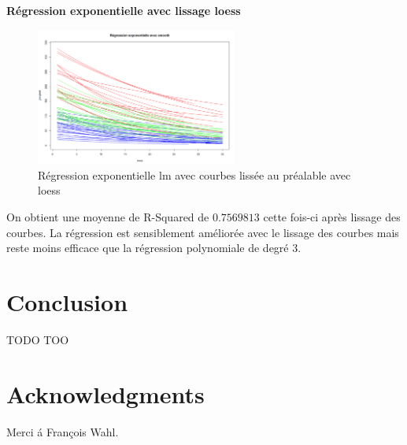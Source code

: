 \documentclass[12pt]{article}
\begin{document}
\textbf{R\'egression exponentielle avec lissage loess}

\begin{figure}[H]
 \centering %
	\includegraphics[width=250px]{reg_exp_smooth_loess}
  \caption{\label{fig:reg_exp_smooth_loess} R\'egression exponentielle lm avec courbes liss\'ee au pr\'ealable avec loess}
\end{figure}

On obtient une moyenne de R-Squared de $0.7569813$ cette fois-ci apr\`es lissage des courbes. La r\'egression est sensiblement am\'elior\'ee avec le lissage des courbes mais reste moins efficace que la r\'egression polynomiale de degr\'e 3.

\newpage

\section{Conclusion}

TODO TOO


\section*{Acknowledgments}
Merci \'a Fran\c cois Wahl.
\end{document}
